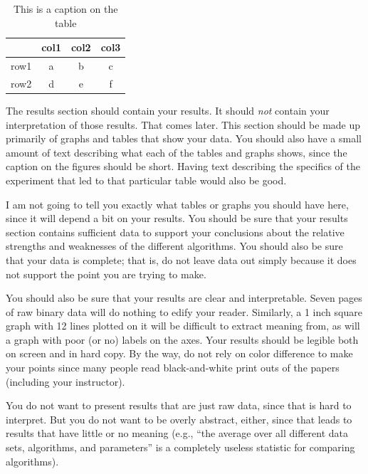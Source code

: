\documentclass[12pt,letterpaper]{article}
\begin{document}
\begin{table}
\begin{center}
\begin{tabular}{|c||c|c|c|}
\hline
& col1 & col2 & col3\\
\hline \hline
row1 & a & b & c\\
\hline 
row2 & d & e & f\\
\hline 
\end{tabular}
\end{center}
\caption{This is a caption on the table}
\label{sometable}
\end{table}

The results section should contain your results.  It should \emph{not} contain
your interpretation of those results.  That comes later.  This section should be
made up primarily of graphs and tables that show your data.  You should also
have a small amount of text describing what each of the tables and graphs shows,
since the caption on the figures should be short.  Having text describing the
specifics of the experiment that led to that particular table would also be
good.  

I am not going to tell you exactly what tables or graphs you should have here,
since it will depend a bit on your results.  You should be sure that your
results section contains sufficient data to support your conclusions about the
relative strengths and weaknesses of the different algorithms.  You should also
be sure that your data is complete; that is, do not leave data out simply because
it does not support the point you are trying to make.

You should also be sure that your results are clear and interpretable.  Seven
pages of raw binary data will do nothing to edify your reader.  Similarly, a
1 inch square graph with 12 lines plotted on it will be difficult to extract
meaning from, as will a graph with poor (or no) labels on the axes.  Your
results should be legible both on screen and in hard copy. By the way, do
not rely on color difference to make your points since many people read
black-and-white print outs of the papers (including your instructor).

You do not want to present results that are just raw data, since that is hard to
interpret.  But you do not want to be overly abstract, either, since that leads to
results that have little or no meaning (e.g., ``the average over all different
data sets, algorithms, and parameters'' is a completely useless statistic for
comparing algorithms).
\end{document}
